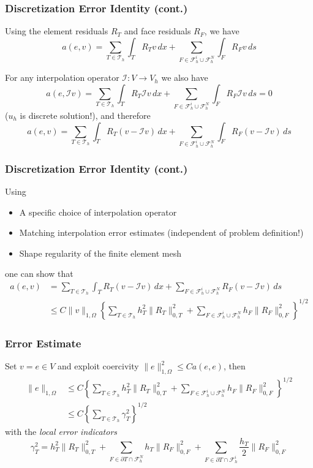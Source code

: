 \documentclass[aspectratio=169,11pt]{beamer}
\theoremstyle{definition}
\begin{document}
\begin{frame}
\frametitle{Discretization Error Identity (cont.)}
Using the element residuals $R_T$ and face residuals $R_F$, we have
\begin{equation*}
  a(e,v) = \sum_{T \in \mathcal{T}_h} \int_T R_T v \,dx + \sum_{F \in \mathcal{F}_h^i \cup \mathcal{F}_h^N} \int_F R_F v \,ds
\end{equation*}

For any interpolation operator $\mathcal{I} \colon V \to V_h$ we also have
\begin{equation*}
  a(e,\mathcal{I}v) = \sum_{T \in \mathcal{T}_h} \int_T R_T \mathcal{I} v \,dx + \sum_{F \in \mathcal{F}_h^i \cup \mathcal{F}_h^N} \int_F R_F \mathcal{I} v \,ds = 0
\end{equation*}
($u_h$ is discrete solution!), and therefore
\begin{equation*}
  a(e,v) = \sum_{T \in \mathcal{T}_h} \int_T R_T (v - \mathcal{I} v) \,dx + \sum_{F \in \mathcal{F}_h^i \cup \mathcal{F}_h^N} \int_F R_F (v - \mathcal{I} v) \,ds
\end{equation*}
\end{frame}

\begin{frame}
\frametitle{Discretization Error Identity (cont.)}
Using
\begin{itemize}
  \item A specific choice of interpolation operator
  \item Matching interpolation error estimates (independent of problem definition!)
  \item Shape regularity of the finite element mesh
\end{itemize}
one can show that
\begin{align*}
  a(e,v) &= \sum_{T \in \mathcal{T}_h} \int_T R_T (v - \mathcal{I} v) \,dx + \sum_{F \in \mathcal{F}_h^i \cup \mathcal{F}_h^N} R_F (v - \mathcal{I} v) \,ds \\
  &\leq C \| v \|_{1,\Omega} \left\{ \sum_{T \in \mathcal{T}_h} h_T^2 \|R_T\|_{0,T}^2 + \sum_{F \in \mathcal{F}_h^i \cup \mathcal{F}_h^N} h_F \| R_F \|_{0,F}^2 \right\}^{1/2}
\end{align*}
\end{frame}

\begin{frame}
\frametitle{Error Estimate}
Set $v = e \in V$ and exploit coercivity $\|e\|_{1,\Omega}^2 \leq C a(e,e)$, then
\begin{align*}
  \|e\|_{1,\Omega} &\leq C \left\{ \sum_{T \in \mathcal{T}_h} h_T^2 \|R_T\|_{0,T}^2 + \sum_{F \in \mathcal{F}_h^i \cup \mathcal{F}_h^N} h_F \|R_F\|_{0,F}^2 \right\}^{1/2} \\
  &\leq C \left\{ \sum_{T \in \mathcal{T}_h} \gamma_T^2 \right\}^{1/2}
\end{align*}
with the \emph{local error indicators}
\begin{equation*}
  \gamma_T^2 = h_T^2 \|R_T\|_{0,T}^2 + \sum_{F \in \partial T \cap \mathcal{F}_h^N} h_T \|R_F\|_{0,F}^2 + \sum_{F \in \partial T \cap \mathcal{F}_h^i} \frac{h_T}{2} \|R_F\|_{0,F}^2
\end{equation*}
\end{frame}
\end{document}
